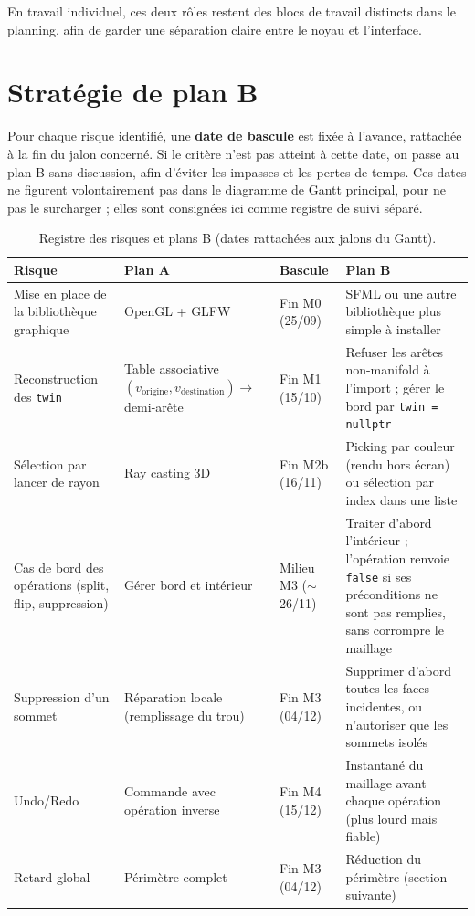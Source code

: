 \documentclass[11pt,a4paper]{article}
\begin{document}
En travail individuel, ces deux rôles restent des blocs de travail distincts dans le planning, afin de garder une séparation claire entre le noyau et l'interface.

\section{Stratégie de plan B}

Pour chaque risque identifié, une \textbf{date de bascule} est fixée à l'avance, rattachée à la fin du jalon concerné. Si le critère n'est pas atteint à cette date, on passe au plan B sans discussion, afin d'éviter les impasses et les pertes de temps. Ces dates ne figurent volontairement pas dans le diagramme de Gantt principal, pour ne pas le surcharger ; elles sont consignées ici comme registre de suivi séparé.

\begin{table}[H]
\centering
\small
\begin{tabularx}{\textwidth}{@{}Y Y l Y@{}}
\toprule
\textbf{Risque} & \textbf{Plan A} & \textbf{Bascule} & \textbf{Plan B} \\
\midrule
Mise en place de la bibliothèque graphique & OpenGL + GLFW & Fin M0 (25/09) & SFML ou une autre bibliothèque plus simple à installer \\
Reconstruction des \texttt{twin} & Table associative $(v_{\mathrm{origine}}, v_{\mathrm{destination}}) \to$ demi-arête & Fin M1 (15/10) & Refuser les arêtes non-manifold à l'import ; gérer le bord par \texttt{twin = nullptr} \\
Sélection par lancer de rayon & Ray casting 3D & Fin M2b (16/11) & Picking par couleur (rendu hors écran) ou sélection par index dans une liste \\
Cas de bord des opérations (split, flip, suppression) & Gérer bord et intérieur & Milieu M3 (\ensuremath{\sim}26/11) & Traiter d'abord l'intérieur ; l'opération renvoie \texttt{false} si ses préconditions ne sont pas remplies, sans corrompre le maillage \\
Suppression d'un sommet & Réparation locale (remplissage du trou) & Fin M3 (04/12) & Supprimer d'abord toutes les faces incidentes, ou n'autoriser que les sommets isolés \\
Undo/Redo & Commande avec opération inverse & Fin M4 (15/12) & Instantané du maillage avant chaque opération (plus lourd mais fiable) \\
Retard global & Périmètre complet & Fin M3 (04/12) & Réduction du périmètre (section suivante) \\
\bottomrule
\end{tabularx}
\caption{Registre des risques et plans B (dates rattachées aux jalons du Gantt).}
\end{table}
\end{document}
